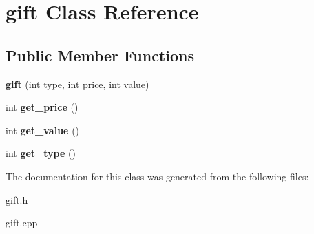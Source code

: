 \hypertarget{classgift}{}\section{gift Class Reference}
\label{classgift}
\subsection*{Public Member Functions}
\begin{DoxyCompactItemize}
\item 
{\bfseries gift} (int type, int price, int value)\hypertarget{classgift_ab4bed39f05d524ccd1389fa22cf6dabb}{}\label{classgift_ab4bed39f05d524ccd1389fa22cf6dabb}

\item 
int {\bfseries get\+\_\+price} ()\hypertarget{classgift_a94b57756c3b2605ecf42c5b96ff0105d}{}\label{classgift_a94b57756c3b2605ecf42c5b96ff0105d}

\item 
int {\bfseries get\+\_\+value} ()\hypertarget{classgift_ae140b4f29151fb9ccf6af93aa0a6169d}{}\label{classgift_ae140b4f29151fb9ccf6af93aa0a6169d}

\item 
int {\bfseries get\+\_\+type} ()\hypertarget{classgift_a3d3ca3cc53021b00bbf083f305eb0783}{}\label{classgift_a3d3ca3cc53021b00bbf083f305eb0783}

\end{DoxyCompactItemize}


The documentation for this class was generated from the following files\+:\begin{DoxyCompactItemize}
\item 
gift.\+h\item 
gift.\+cpp\end{DoxyCompactItemize}
